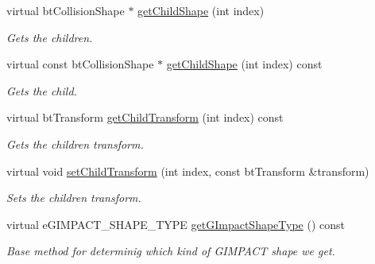\begin{DoxyCompactItemize}
\mbox{\label{classbtGImpactMeshShape_ae268fb9f2813b1fa4171d87e201c37a7}} 
virtual bt\+Collision\+Shape $\ast$ \hyperlink{classbtGImpactMeshShape_ae268fb9f2813b1fa4171d87e201c37a7}{get\+Child\+Shape} (int index)
\begin{DoxyCompactList}\small\item\em Gets the children. \end{DoxyCompactList}\item 
\mbox{\label{classbtGImpactMeshShape_a7f749f41c8d64e74778d18fda553cfdb}} 
virtual const bt\+Collision\+Shape $\ast$ \hyperlink{classbtGImpactMeshShape_a7f749f41c8d64e74778d18fda553cfdb}{get\+Child\+Shape} (int index) const
\begin{DoxyCompactList}\small\item\em Gets the child. \end{DoxyCompactList}\item 
\mbox{\label{classbtGImpactMeshShape_a413c40feffbdb494f8c7f9a4810e89e9}} 
virtual bt\+Transform \hyperlink{classbtGImpactMeshShape_a413c40feffbdb494f8c7f9a4810e89e9}{get\+Child\+Transform} (int index) const
\begin{DoxyCompactList}\small\item\em Gets the children transform. \end{DoxyCompactList}\item 
virtual void \hyperlink{classbtGImpactMeshShape_a274feed3c9a38a6af5c9f1141ae9ac1a}{set\+Child\+Transform} (int index, const bt\+Transform \&transform)
\begin{DoxyCompactList}\small\item\em Sets the children transform. \end{DoxyCompactList}\item 
virtual e\+G\+I\+M\+P\+A\+C\+T\+\_\+\+S\+H\+A\+P\+E\+\_\+\+T\+Y\+PE \hyperlink{classbtGImpactMeshShape_ac48641f3b35339f6de0716197bbbe302}{get\+G\+Impact\+Shape\+Type} () const
\begin{DoxyCompactList}\small\item\em Base method for determinig which kind of G\+I\+M\+P\+A\+CT shape we get. \end{DoxyCompactList}\item 
\mbox{\label{classbtGImpactMeshShape_afdc1bc83b210d4d6c2fb4306d9c841bf}} 

\end{DoxyCompactItemize}
